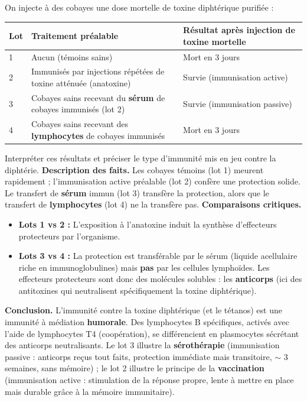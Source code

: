 \documentclass[11pt]{article}
\newcommand{\cle}[1]{{\popxbold\color{popdark}#1}}
\begin{document}
\begin{exoresolu}
On injecte à des cobayes une dose mortelle de toxine diphtérique purifiée :
\begin{center}
\begin{tabularx}{\linewidth}{|l|X|X|}\hline
\rowcolor{popblueL} \textbf{Lot} & \textbf{Traitement préalable} & \textbf{Résultat après injection de toxine mortelle} \\ \hline
1 & Aucun (témoins sains) & Mort en 3 jours \\ \hline
2 & Immunisés par injections répétées de toxine atténuée (anatoxine) & Survie (immunisation active) \\ \hline
3 & Cobayes sains recevant du \textbf{sérum} de cobayes immunisés (lot 2) & Survie (immunisation passive) \\ \hline
4 & Cobayes sains recevant des \textbf{lymphocytes} de cobayes immunisés & Mort en 3 jours \\ \hline
\end{tabularx}
\end{center}
Interpréter ces résultats et préciser le type d'immunité mis en jeu contre la diphtérie.
\tcblower
\textbf{Description des faits.} Les cobayes témoins (lot 1) meurent rapidement ; l'immunisation active préalable (lot 2) confère une protection solide. Le transfert de \textbf{sérum} immun (lot 3) transfère la protection, alors que le transfert de \textbf{lymphocytes} (lot 4) ne la transfère pas.
\textbf{Comparaisons critiques.}
\begin{itemize}
\item \textbf{Lots 1 vs 2 :} L'exposition à l'anatoxine induit la synthèse d'effecteurs protecteurs par l'organisme.
\item \textbf{Lots 3 vs 4 :} La protection est transférable par le sérum (liquide acellulaire riche en immunoglobulines) mais \textbf{pas} par les cellules lymphoïdes. Les effecteurs protecteurs sont donc des molécules solubles : les \textbf{anticorps} (ici des \cle{antitoxines} qui neutralisent spécifiquement la toxine diphtérique).
\end{itemize}
\textbf{Conclusion.} L'immunité contre la toxine diphtérique (et le tétanos) est une immunité à médiation \textbf{humorale}. Des lymphocytes B spécifiques, activés avec l'aide de lymphocytes T4 (coopération), se différencient en plasmocytes sécrétant des anticorps neutralisants. Le lot 3 illustre la \textbf{sérothérapie} (immunisation passive : anticorps reçus tout faits, protection immédiate mais transitoire, $\sim$ 3 semaines, sans mémoire) ; le lot 2 illustre le principe de la \textbf{vaccination} (immunisation active : stimulation de la réponse propre, lente à mettre en place mais durable grâce à la mémoire immunitaire).
\end{exoresolu}
\end{document}
